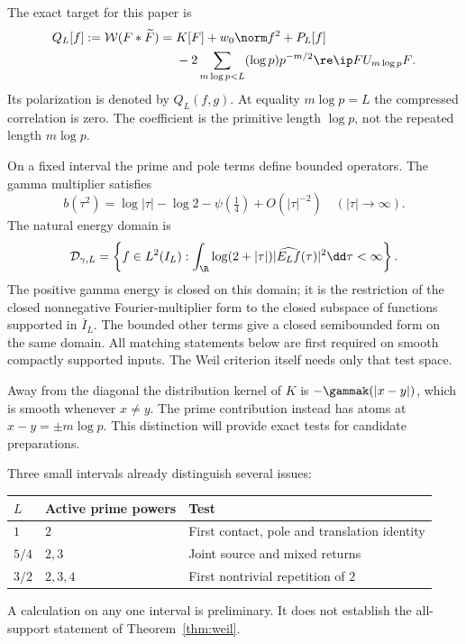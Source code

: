 The exact target for this paper is
\begin{align}
 Q_L[f]:=\mathcal W(F*\widetilde F)
 ={}&K[F]+w_0\norm f^2+P_L[f]\notag\\
 &-2\sum_{m\log p<L}(\log p)p^{-m/2}
           \re\ip F{U_{m\log p}F}.
 \label{eq:target}
\end{align}
Its polarization is denoted by $Q_L(f,g)$. At equality $m\log p=L$
the compressed correlation is zero. The coefficient is the primitive
length $\log p$, not the repeated length $m\log p$.

On a fixed interval the prime and pole terms define bounded operators.
The gamma multiplier satisfies
\begin{equation}\label{eq:gamma-growth}
 b(\tau^2)=\log|\tau|-\log2-\psi(\tfrac14)+O(|\tau|^{-2})
 \quad (|\tau|\longrightarrow\infty).
\end{equation}
The natural energy domain is
\begin{equation}\label{eq:energy-domain}
 \mathcal D_{\gamma,L}=
 \left\{f\in L^2(I_L):
   \int_\R\log(2+|\tau|)|\widehat{E_Lf}(\tau)|^2\dd\tau<\infty\right\}.
\end{equation}
The positive gamma energy is closed on this domain; it is the restriction
of the closed nonnegative Fourier-multiplier form to the closed subspace
of functions supported in $\overline I_L$. The bounded other terms give
a closed semibounded form on the same domain. All matching statements
below are first required on smooth compactly supported inputs. The Weil
criterion itself needs only that test space.

Away from the diagonal the distribution kernel of $K$ is
$-\gammak(|x-y|)$, which is smooth whenever $x\ne y$. The prime
contribution instead has atoms at $x-y=\pm m\log p$. This distinction
will provide exact tests for candidate preparations.

Three small intervals already distinguish several issues:
\begin{center}
\begin{tabular}{lll}
\toprule
$L$ & Active prime powers & Test \\
\midrule
$1$ & $2$ & First contact, pole and translation identity \\
$5/4$ & $2,3$ & Joint source and mixed returns \\
$3/2$ & $2,3,4$ & First nontrivial repetition of $2$ \\
\bottomrule
\end{tabular}
\end{center}
A calculation on any one interval is preliminary. It does not establish
the all-support statement of Theorem~\ref{thm:weil}.
